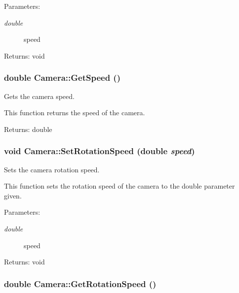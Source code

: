 \begin{Desc}
\item[Parameters:]
\begin{description}
\item[{\em double}]speed \end{description}
\end{Desc}
\begin{Desc}
\item[Returns:]void \end{Desc}
\hypertarget{class_camera_6d305ab5442a489253a321b2a45b11b6}{
\subsubsection[GetSpeed]{\setlength{\rightskip}{0pt plus 5cm}double Camera::GetSpeed ()}}
\label{class_camera_6d305ab5442a489253a321b2a45b11b6}


Gets the camera speed. 

This function returns the speed of the camera.

\begin{Desc}
\item[Returns:]double \end{Desc}
\hypertarget{class_camera_bce25d2360c703fb5ac6da02d3991bda}{
\subsubsection[SetRotationSpeed]{\setlength{\rightskip}{0pt plus 5cm}void Camera::SetRotationSpeed (double {\em speed})}}
\label{class_camera_bce25d2360c703fb5ac6da02d3991bda}


Sets the camera rotation speed. 

This function sets the rotation speed of the camera to the double parameter given.

\begin{Desc}
\item[Parameters:]
\begin{description}
\item[{\em double}]speed \end{description}
\end{Desc}
\begin{Desc}
\item[Returns:]void \end{Desc}
\hypertarget{class_camera_eebe84aaf8b615505ef2ad7f7bbffbb9}{
\subsubsection[GetRotationSpeed]{\setlength{\rightskip}{0pt plus 5cm}double Camera::GetRotationSpeed ()}}
\label{class_camera_eebe84aaf8b615505ef2ad7f7bbffbb9}


